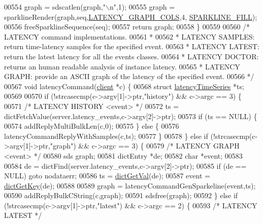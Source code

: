 \begin{DoxyCode}
{{{{{{{{00554     graph = sdscatlen(graph,\textcolor{stringliteral}{"\(\backslash\)n"},1);
00555     graph = sparklineRender(graph,seq,\hyperlink{latency_8c_a3acc869332e75f8b926c821d6cc97c8e}{LATENCY\_GRAPH\_COLS},4,
      \hyperlink{sparkline_8h_af6a091d13a723f2ac2a848be4235a6cd}{SPARKLINE\_FILL});
00556     freeSparklineSequence(seq);
00557     \textcolor{keywordflow}{return} graph;
00558 \}
00559 
00560 \textcolor{comment}{/* LATENCY command implementations.}
00561 \textcolor{comment}{ *}
00562 \textcolor{comment}{ * LATENCY SAMPLES: return time-latency samples for the specified event.}
00563 \textcolor{comment}{ * LATENCY LATEST: return the latest latency for all the events classes.}
00564 \textcolor{comment}{ * LATENCY DOCTOR: returns an human readable analysis of instance latency.}
00565 \textcolor{comment}{ * LATENCY GRAPH: provide an ASCII graph of the latency of the specified event.}
00566 \textcolor{comment}{ */}
00567 \textcolor{keywordtype}{void} latencyCommand(\hyperlink{structclient}{client} *c) \{
00568     \textcolor{keyword}{struct} \hyperlink{structlatencyTimeSeries}{latencyTimeSeries} *ts;
00569 
00570     \textcolor{keywordflow}{if} (!strcasecmp(c->argv[1]->ptr,\textcolor{stringliteral}{"history"}) && c->argc == 3) \{
00571         \textcolor{comment}{/* LATENCY HISTORY <event> */}
00572         ts = dictFetchValue(server.latency\_events,c->argv[2]->ptr);
00573         \textcolor{keywordflow}{if} (ts == NULL) \{
00574             addReplyMultiBulkLen(c,0);
00575         \} \textcolor{keywordflow}{else} \{
00576             latencyCommandReplyWithSamples(c,ts);
00577         \}
00578     \} \textcolor{keywordflow}{else} \textcolor{keywordflow}{if} (!strcasecmp(c->argv[1]->ptr,\textcolor{stringliteral}{"graph"}) && c->argc == 3) \{
00579         \textcolor{comment}{/* LATENCY GRAPH <event> */}
00580         sds graph;
00581         dictEntry *de;
00582         \textcolor{keywordtype}{char} *event;
00583 
00584         de = dictFind(server.latency\_events,c->argv[2]->ptr);
00585         \textcolor{keywordflow}{if} (de == NULL) \textcolor{keywordflow}{goto} nodataerr;
00586         ts = \hyperlink{dict_8h_ae8d2cc391873b2bea2b87c4f80f43120}{dictGetVal}(de);
00587         event = \hyperlink{dict_8h_a3271c334309904a3086deca94f96e46e}{dictGetKey}(de);
00588 
00589         graph = latencyCommandGenSparkeline(event,ts);
00590         addReplyBulkCString(c,graph);
00591         sdsfree(graph);
00592     \} \textcolor{keywordflow}{else} \textcolor{keywordflow}{if} (!strcasecmp(c->argv[1]->ptr,\textcolor{stringliteral}{"latest"}) && c->argc == 2) \{
00593         \textcolor{comment}{/* LATENCY LATEST */}
}}}}}}}}
\end{DoxyCode}
